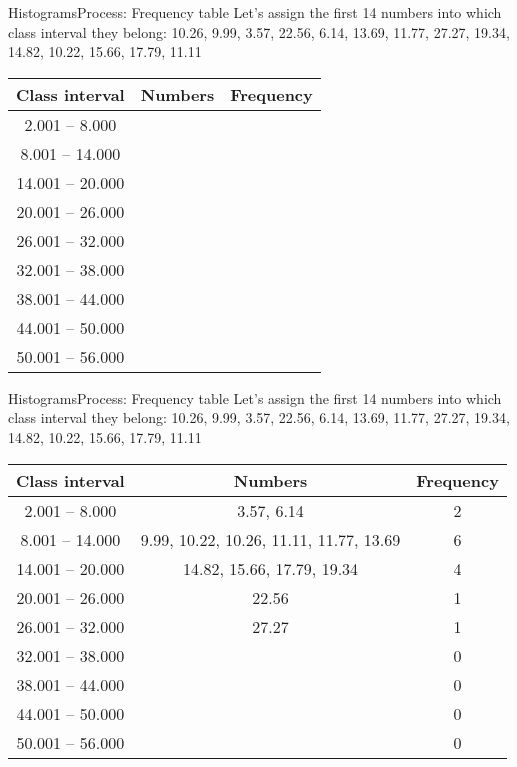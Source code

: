 \documentclass[xcolor=dvipsnames]{beamer}
\begin{document}
\begin{frame}{Histograms}{Process: Frequency table}
Let's assign the first 14 numbers into which class interval they belong:
10.26,  9.99,  3.57, 22.56,  6.14, 13.69, 11.77, 27.27, 19.34, 14.82, 10.22, 15.66, 17.79, 11.11
\begin{center}
	\begin{tabular}{|c|c|c|}
		\hline
		\textbf{Class interval} & \textbf{Numbers} & \textbf{Frequency} \\
		\hline \hline
		2.001 -- 8.000 & & \\  \hline 
		8.001 -- 14.000 & & \\  \hline 
		14.001 -- 20.000 & & \\  \hline 
		20.001 -- 26.000 & & \\  \hline 
		26.001 -- 32.000 & & \\  \hline 
		32.001 -- 38.000 & & \\  \hline 
		38.001 -- 44.000 & & \\  \hline 
		44.001 -- 50.000 & & \\  \hline 
		50.001 -- 56.000 & & \\ \hline 
	\end{tabular}
\end{center}
\end{frame}

\begin{frame}{Histograms}{Process: Frequency table}
	Let's assign the first 14 numbers into which class interval they belong:
	10.26,  9.99,  3.57, 22.56,  6.14, 13.69, 11.77, 27.27, 19.34, 14.82, 10.22, 15.66, 17.79, 11.11
	\begin{center}
		\begin{tabular}{|c|c|c|}
			\hline
			\textbf{Class interval} & \textbf{Numbers} & \textbf{Frequency} \\
			\hline \hline
			2.001 -- 8.000 & 3.57, 6.14 & 2\\ \hline 
			8.001 -- 14.000 & 9.99, 10.22, 10.26, 11.11, 11.77, 13.69 & 6 \\ \hline 
			14.001 -- 20.000 & 14.82, 15.66, 17.79, 19.34 & 4\\ \hline 
			20.001 -- 26.000 & 22.56 & 1 \\ \hline 
			26.001 -- 32.000 & 27.27 & 1 \\ \hline 
			32.001 -- 38.000 &  & 0 \\ \hline 
			38.001 -- 44.000 & & 0 \\ \hline 
			44.001 -- 50.000 & & 0 \\ \hline 
			50.001 -- 56.000 & & 0\\ \hline 
		\end{tabular}
	\end{center}
\end{frame}
\end{document}
